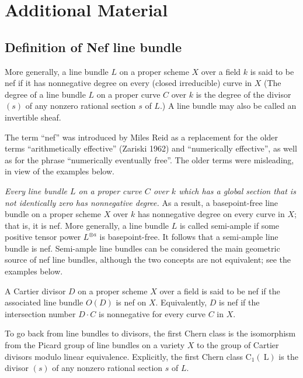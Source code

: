 \documentclass[twoside,openany,12pt]{beautynote}
\begin{document}
\chapter{Additional Material}
\section{Definition of Nef line bundle}
\begin{definition}\label{def:nef line bundle}
    More generally, a line bundle $L$ on a proper scheme $X$ over a field $k$ is said to be nef if it has nonnegative degree on every (closed irreducible) curve in $X$ (The degree of a line bundle $L$ on a proper curve $C$ over $k$ is the degree of the divisor $(s)$ of any nonzero rational section $s$ of $L$.) A line bundle may also be called an invertible sheaf.
\end{definition}

The term ``nef'' was introduced by Miles Reid as a replacement for the older terms ``arithmetically effective'' (Zariski 1962) and ``numerically effective'', as well as for the phrase ``numerically eventually free''. The older terms were misleading, in view of the examples below.

\textit{Every line bundle $L$ on a proper curve $C$ over $k$ which has a global section that is not identically zero has nonnegative degree.} As a result, a basepoint-free line bundle on a proper scheme $X$ over $k$ has nonnegative degree on every curve in $X$; that is, it is nef.  More generally, a line bundle $L$ is called semi-ample if some positive tensor power $L^{\otimes a}$ is basepoint-free. It follows that a semi-ample line bundle is nef. Semi-ample line bundles can be considered the main geometric source of nef line bundles, although the two concepts are not equivalent; see the examples below.

A Cartier divisor $D$ on a proper scheme $X$ over a field is said to be nef if the associated line bundle $O(D)$ is nef on $X$. Equivalently, $D$ is nef if the intersection number $D \cdot C$ is nonnegative for every curve $C$ in $X$.

To go back from line bundles to divisors, the first Chern class is the isomorphism from the Picard group of line bundles on a variety $X$ to the group of Cartier divisors modulo linear equivalence. Explicitly, the first Chern class $\mathrm{C}_1(\mathrm{~L})$ is the divisor $(s)$ of any nonzero rational section $s$ of $L$.
\end{document}
